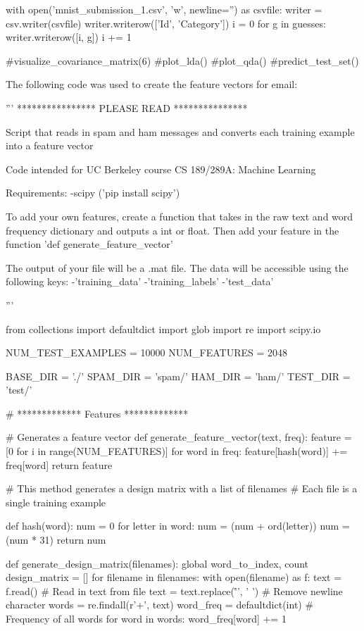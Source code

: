 \documentclass{article}
\begin{document}
\begin{python}
    with open('mnist_submission_1.csv', 'w', newline='') as csvfile:
        writer = csv.writer(csvfile)
        writer.writerow(['Id', 'Category'])
        i = 0
        for g in guesses:
            writer.writerow([i, g])
            i += 1

#visualize_covariance_matrix(6)
#plot_lda()
#plot_qda()
#predict_test_set()
\end{python}
\newpage
The following code was used to create the feature vectors for email:
\begin{python}
'''
**************** PLEASE READ ***************

Script that reads in spam and ham messages and converts each training example
into a feature vector

Code intended for UC Berkeley course CS 189/289A: Machine Learning

Requirements:
-scipy ('pip install scipy')

To add your own features, create a function that takes in the raw text and
word frequency dictionary and outputs a int or float. Then add your feature
in the function 'def generate_feature_vector'

The output of your file will be a .mat file. The data will be accessible using
the following keys:
    -'training_data'
    -'training_labels'
    -'test_data'

'''

from collections import defaultdict
import glob
import re
import scipy.io

NUM_TEST_EXAMPLES = 10000
NUM_FEATURES = 2048

BASE_DIR = './'
SPAM_DIR = 'spam/'
HAM_DIR = 'ham/'
TEST_DIR = 'test/'

# ************* Features *************

# Generates a feature vector
def generate_feature_vector(text, freq):
    feature = [0 for i in range(NUM_FEATURES)]
    for word in freq:
        feature[hash(word)] += freq[word]
    return feature

# This method generates a design matrix with a list of filenames
# Each file is a single training example

def hash(word):
    num = 0
    for letter in word:
        num = (num + ord(letter)) %
        num = (num * 31) %
    return num

def generate_design_matrix(filenames):
    global word_to_index, count
    design_matrix = []
    for filename in filenames:
        with open(filename) as f:
            text = f.read() # Read in text from file
            text = text.replace('\r\n', ' ') # Remove newline character
            words = re.findall(r'\w+', text)
            word_freq = defaultdict(int) # Frequency of all words
            for word in words:
                word_freq[word] += 1


\end{python}
\end{document}
